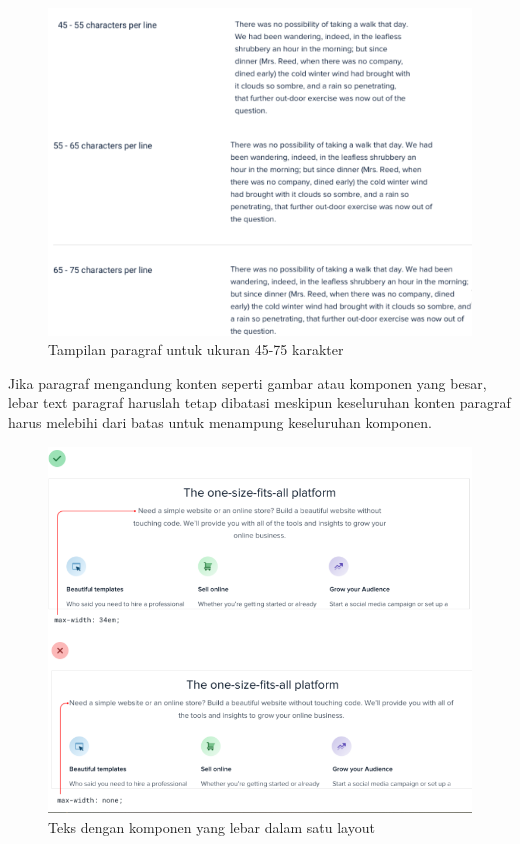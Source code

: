 \begin{figure}[H]
	{\centering
		\includegraphics[keepaspectratio, width=14cm]{gambar/refactoring-ui-g12.png}
		\caption{Tampilan paragraf untuk ukuran 45-75 karakter \citep{refactoringui}}}
	\label{gambar:refactoring-ui-g12.png}
\end{figure}

Jika paragraf mengandung konten seperti gambar atau komponen yang besar, lebar text paragraf haruslah tetap dibatasi meskipun keseluruhan konten paragraf harus melebihi dari batas untuk menampung keseluruhan komponen.

\begin{figure}[H]
	{\centering
		\includegraphics[keepaspectratio, width=12cm]{gambar/refactoring-ui-g13.png}
		\caption{Teks dengan komponen yang lebar dalam satu layout \citep{refactoringui}}}
	\label{gambar:refactoring-ui-g13.png}
\end{figure}

